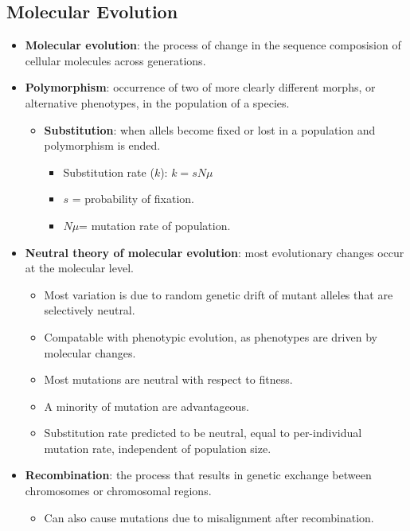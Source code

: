 \documentclass[12pt,a4paper]{article}
\begin{document}
\subsection{Molecular Evolution}
\begin{itemize}
    \item \textbf{Molecular evolution}: the process of change in the sequence composision of cellular molecules across generations.
    \item \textbf{Polymorphism}: occurrence of two of more clearly different morphs, or alternative phenotypes, in the population of a species.
    \begin{itemize}
        \item \textbf{Substitution}: when allels become fixed or lost in a population and polymorphism is ended.
            \begin{itemize}
                \item Substitution rate (\(k\)): \(k = sN\mu\)
                \item \(s\) = probability of fixation.
                \item \(N\mu\)= mutation rate of population.
            \end{itemize}
    \end{itemize}
    \item \textbf{Neutral theory of molecular evolution}: most evolutionary changes occur at the molecular level.
        \begin{itemize}
            \item Most variation is due to random genetic drift of mutant alleles that are selectively neutral.
            \item Compatable with phenotypic evolution, as phenotypes are driven by molecular changes.
            \item Most mutations are neutral with respect to fitness.
            \item A minority of mutation are advantageous.
            \item Substitution rate predicted to be neutral, equal to per-individual mutation rate, {\color{o-Sun}independent} of population size.\Psi  
        \end{itemize}
    \item \textbf{Recombination}: the process that results in genetic exchange between chromosomes or chromosomal regions.
        \begin{itemize}
            \item Can also cause mutations due to misalignment after recombination.

\end{itemize}
\end{itemize}
\end{document}
